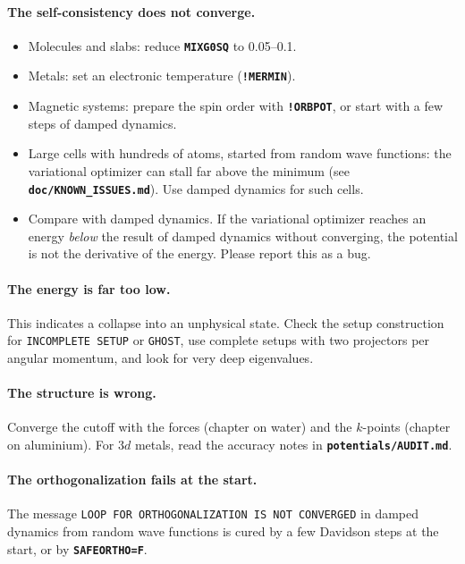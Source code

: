 \documentclass[11pt,a4paper,oneside]{book}
\newcommand{\key}[1]{\textbf{\texttt{#1}}}
\newcommand{\file}[1]{\textbf{\texttt{#1}}}
\begin{document}
\paragraph{The self-consistency does not converge.}
\begin{itemize}
\item Molecules and slabs: reduce \key{MIXG0SQ} to 0.05--0.1.
\item Metals: set an electronic temperature (\key{!MERMIN}).
\item Magnetic systems: prepare the spin order with \key{!ORBPOT}, or
  start with a few steps of damped dynamics.
\item Large cells with hundreds of atoms, started from random wave
  functions: the variational optimizer can stall far above the minimum
  (see \file{doc/KNOWN\_ISSUES.md}). Use damped dynamics for such cells.
\item Compare with damped dynamics. If the variational optimizer
  reaches an energy \emph{below} the result of damped dynamics without
  converging, the potential is not the derivative of the energy. Please
  report this as a bug.
\end{itemize}

\paragraph{The energy is far too low.} This indicates a collapse into
an unphysical state. Check the setup construction for
\texttt{INCOMPLETE SETUP} or \texttt{GHOST}, use complete setups with
two projectors per angular momentum, and look for very deep
eigenvalues.

\paragraph{The structure is wrong.} Converge the cutoff with the forces
(chapter on water) and the $k$-points (chapter on aluminium). For $3d$
metals, read the accuracy notes in \file{potentials/AUDIT.md}.

\paragraph{The orthogonalization fails at the start.} The message
\texttt{LOOP FOR ORTHOGONALIZATION IS NOT CONVERGED} in damped dynamics
from random wave functions is cured by a few Davidson steps at the
start, or by \key{SAFEORTHO=F}.

\end{document}

